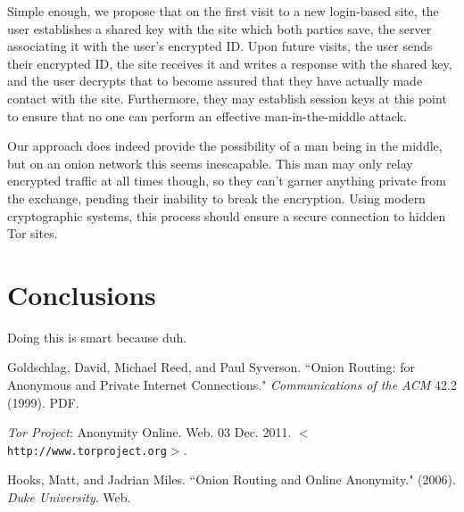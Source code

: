 \documentclass[12pt]{article}
\begin{document}
Simple enough, we propose that on the first visit to a new login-based site, the user establishes a shared key with the site which both parties save, the server associating it with the user's encrypted ID. Upon future visits, the user sends their encrypted ID, the site receives it and writes a response with the shared key, and the user decrypts that to become assured that they have actually made contact with the site. Furthermore, they may establish session keys at this point to ensure that no one can perform an effective man-in-the-middle attack.

Our approach does indeed provide the possibility of a man being in the middle, but on an onion network this seems inescapable. This man may only relay encrypted traffic at all times though, so they can't garner anything private from the exchange, pending their inability to break the encryption. Using modern cryptographic systems, this process should ensure a secure connection to hidden Tor sites.

\section{Conclusions}
Doing this is smart because duh.



\begin{thebibliography}{1}

   Goldschlag, David, Michael Reed, and Paul Syverson. ``Onion Routing: for Anonymous and Private Internet Connections." {\it Communications of the ACM} 42.2 (1999). PDF.
  
   {\it Tor Project}: Anonymity Online. Web. 03 Dec. 2011. $<${\tt http://www.torproject.org}$>$.

    Hooks, Matt, and Jadrian Miles. ``Onion Routing and Online Anonymity." (2006). {\it Duke University}. Web.

  \end{thebibliography}
\end{document}
